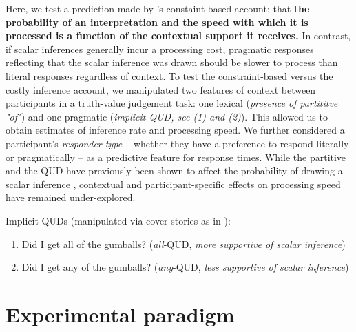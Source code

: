 \documentclass[10pt,letterpaper]{article}
\begin{document}
Here, we test a prediction made by 
's constaint-based account: that \textbf{the probability of an interpretation and the speed with which it is processed is a function of the contextual support it receives.} In contrast, if scalar inferences generally incur a processing cost, pragmatic responses reflecting that the scalar inference was drawn should be slower to process than literal responses regardless of context. To test the constraint-based versus the costly inference account, we manipulated two features of context between participants in a truth-value judgement task: one lexical (\textit{presence of partititve "of"}) and one pragmatic (\textit{implicit QUD, see (1) and (2)}). This allowed us to obtain estimates of inference rate and processing speed. We further considered a participant’s \textit{responder type  --} whether they have a preference to respond literally or pragmatically -- as a predictive feature for response times. While the partitive and the QUD have previously been shown to affect the probability of drawing a scalar inference \cite{Zondervan2010,Degen2015,DegenGoodman2014,DegenTanenhaus2015}, contextual and participant-specific effects on processing speed have remained under-explored.

Implicit QUDs (manipulated via cover stories as in ):
\begin{enumerate}
  \item Did I get all of the gumballs? (\textit{all}-QUD, \textit{more supportive of scalar inference})
  \item Did I get any of the gumballs? (\textit{any}-QUD, \textit{less supportive of scalar inference})
\end{enumerate} 


\section{Experimental paradigm}
\end{document}
